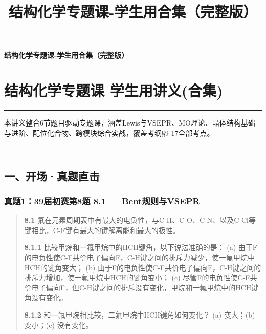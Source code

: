 \documentclass[a4paper,11pt]{ctexart}
\title{结构化学专题课-学生用合集（完整版）}
\date{}
\newcommand{\箭}{\ensuremath{\rightarrow}}
\newcommand{\左箭}{\ensuremath{\leftarrow}}
\newcommand{\上箭}{\ensuremath{\uparrow}}
\newcommand{\下箭}{\ensuremath{\downarrow}}
\newcommand{\衡}{\ensuremath{\rightleftharpoons}}
\newcommand{\双箭}{\ensuremath{\leftrightarrow}}
\newcommand{\约等于}{\ensuremath{\approx}}
\newcommand{\小于等于}{\ensuremath{\leq}}
\newcommand{\大于等于}{\ensuremath{\geq}}
\newcommand{\不等于}{\ensuremath{\neq}}
\newcommand{\西格马}{\ensuremath{\sigma}}
\newcommand{\派}{\ensuremath{\pi}}
\begin{document}
\thispagestyle{plain}
\begin{center}
{\bfseries 结构化学专题课-学生用合集（完整版）\par}
\end{center}
\vspace{1em}
\section{结构化学专题课 学生用讲义(合集)}\label{ux7ed3ux6784ux5316ux5b66ux4e13ux9898ux8bfe-ux5b66ux751fux7528ux8bb2ux4e49ux5408ux96c6}

\begin{center}\rule{0.5\linewidth}{0.5pt}\end{center}

本讲义整合6节题目驱动专题课，涵盖Lewis与VSEPR、MO理论、晶体结构基础与进阶、配位化合物、跨模块综合实战，覆盖考纲§9-17全部考点。

\begin{center}\rule{0.5\linewidth}{0.5pt}\end{center}

\begin{center}\rule{0.5\linewidth}{0.5pt}\end{center}

\subsection{一、开场·真题直击}\label{ux4e00ux5f00ux573aux771fux9898ux76f4ux51fb}

\subsubsection{真题1：39届初赛第8题 8.1 --- Bent规则与VSEPR}\label{ux771fux9898139ux5c4aux521dux8d5bux7b2c8ux9898-8.1-bentux89c4ux5219ux4e0evsepr}

\begin{quote}
\textbf{8.1} 氟在元素周期表中有最大的电负性，与C-H、C-O、C-N、以及C-Cl等键相比，C-F键有最大的键解离能和最大的极性。

\textbf{8.1.1} 比较甲烷和一氟甲烷中的HCH键角，以下说法准确的是：
(a) 由于F的电负性使C-F共价电子偏向F，C-H键之间的排斥力减少，使一氟甲烷中HCH的键角变大；
(b) 由于F的电负性使C-F共价电子偏向F，C-H键之间的排斥力增加，使一氟甲烷中HCH的键角变小；
(c) 尽管F的电负性使C-F共价电子偏向F，但C-H键之间的排斥没有变化，甲烷和一氟甲烷中的HCH键角没有变化。

\textbf{8.1.2} 和一氟甲烷相比较，二氟甲烷中HCH键角如何变化？
(a) 变大；(b) 变小；(c) 没有变化。
\end{quote}
\end{document}
